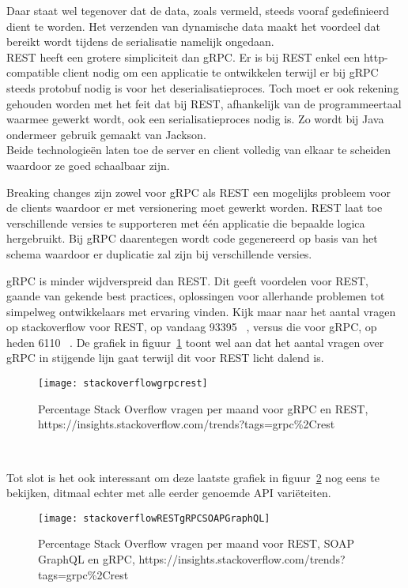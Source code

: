 Daar staat wel tegenover dat de data, zoals vermeld, steeds vooraf gedefinieerd dient te worden.
Het verzenden van dynamische data maakt het voordeel dat bereikt wordt tijdens de serialisatie namelijk ongedaan.\\

REST heeft een grotere simpliciteit dan gRPC. Er is bij REST enkel een http-compatible client nodig om een applicatie te ontwikkelen terwijl
er bij gRPC steeds protobuf nodig is voor het deserialisatieproces. Toch moet er ook rekening gehouden worden met het feit dat bij REST,
afhankelijk van de programmeertaal waarmee gewerkt wordt, ook een serialisatieproces nodig is. Zo wordt bij Java ondermeer gebruik gemaakt van Jackson.\newline
~\autocite{jackson}\\

Beide technologie\"en laten toe de server en client volledig van elkaar te scheiden waardoor ze goed schaalbaar zijn.

Breaking changes zijn zowel voor gRPC als REST een mogelijks probleem voor de clients waardoor er met versionering moet gewerkt worden.
REST laat toe verschillende versies te supporteren met \'e\'en applicatie die bepaalde logica hergebruikt. Bij gRPC daarentegen wordt code gegenereerd op basis van
het schema waardoor er duplicatie zal zijn bij verschillende versies.\newline
~\autocite{grpcversion}

gRPC is minder wijdverspreid dan REST. Dit geeft voordelen voor REST, gaande van gekende best practices, oplossingen voor allerhande problemen
tot simpelweg ontwikkelaars met ervaring vinden. Kijk maar naar het aantal vragen op stackoverflow voor REST, op vandaag 93395 ~\parencite{stackrest},
versus die voor gRPC, op heden 6110 ~\parencite{stackgrpc}. De grafiek in figuur~\ref{fig:stackoverflowgrpcrest} toont wel aan dat het aantal vragen over gRPC in stijgende lijn gaat terwijl
dit voor REST licht dalend is.
\begin{figure}[ht]
    \centering
    \texttt{[image: stackoverflowgrpcrest]}
    \caption{Percentage Stack Overflow vragen per maand voor gRPC en REST,\newline
    https://insights.stackoverflow.com/trends?tags=grpc\%2Crest}
    \label{fig:stackoverflowgrpcrest}
\end{figure}\\
\nocite{stackoverflowRESTgRPC}

Tot slot is het ook interessant om deze laatste grafiek in figuur~\ref{fig:stackoverflowRESTgRPCSOAPGraphQL} nog eens te bekijken, ditmaal echter met alle eerder genoemde API vari\"eteiten.

\begin{figure}[ht]
    \centering
    \texttt{[image: stackoverflowRESTgRPCSOAPGraphQL]}
    \caption{Percentage Stack Overflow vragen per maand voor REST, SOAP GraphQL en gRPC,\newline
    https://insights.stackoverflow.com/trends?tags=grpc\%2Crest}
    \label{fig:stackoverflowRESTgRPCSOAPGraphQL}
\end{figure}
\nocite{stackoverflowRESTgRPCSOAPGraphQL}

